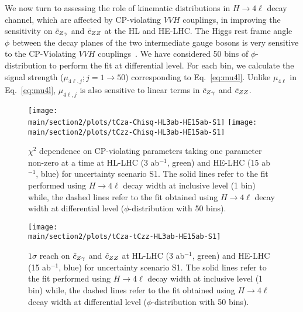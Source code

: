 {
We now turn to assessing  the role of kinematic distributions in $H \to 4\ell$ decay channel, 
which are affected by CP-violating $VVH$ couplings, in improving the sensitivity on $\tilde c_{Z\gamma}$ and $\tilde c_{ZZ}$ at the HL and HE-LHC.
The Higgs rest frame angle $\phi$ between the decay planes of the two intermediate gauge bosons  
is very sensitive to the CP-Violating $VVH$ couplings~\cite{Soni:1993jc,Chang:1993jy,Skjold:1993jd,Buszello:2002uu}. We have considered 50 bins of $\phi$-distribution to perform the fit at differential level. For each bin, we calculate the signal strength ($\mu_{4\ell,j}; j=1\to50$) corresponding 
to Eq.~\ref{eq:mu4l}. Unlike $\mu_{4\ell}$ in Eq.~\ref{eq:mu4l}, $\mu_{4\ell,j}$ is also sensitive to linear terms in $\tilde c_{Z\gamma}$ and $\tilde c_{ZZ}$.


\begin{figure}[h!]
\centering
 \texttt{[image: \\main/section2/plots/tCza-Chisq-HL3ab-HE15ab-S1]}
\texttt{[image: \\main/section2/plots/tCzz-Chisq-HL3ab-HE15ab-S1]}
\caption{ $\chi^2$ dependence on CP-violating parameters taking one parameter non-zero at a time 
at HL-LHC (3 ab$^{-1}$, green) and HE-LHC (15 ab$^{-1}$, blue) for uncertainty scenario S1. The solid lines refer to the fit performed using $H \to 4\ell$ decay width at inclusive level (1 bin) while, the dashed lines refer to the fit obtained using $H \to 4\ell$ decay width at differential level ($\phi$-distribution with 50 bins).}\label{fig:fit1p}
\end{figure}

\begin{figure}
\centering
 \texttt{[image: \\main/section2/plots/tCza-tCzz-HL3ab-HE15ab-S1]}
\caption{ $1\sigma$  reach on $\tilde c_{Z\gamma}$ and 
$\tilde c_{ZZ}$ at HL-LHC (3 ab$^{-1}$, green) and HE-LHC (15 ab$^{-1}$, blue) for uncertainty scenario S1. The solid lines refer to the fit performed using $H \to 4\ell$ decay width at inclusive level (1 bin) while, the dashed lines refer to the fit obtained using $H \to 4\ell$ decay width at differential level ($\phi$-distribution with 50 bins).  }\label{fig:fit2p}
\end{figure}

}
